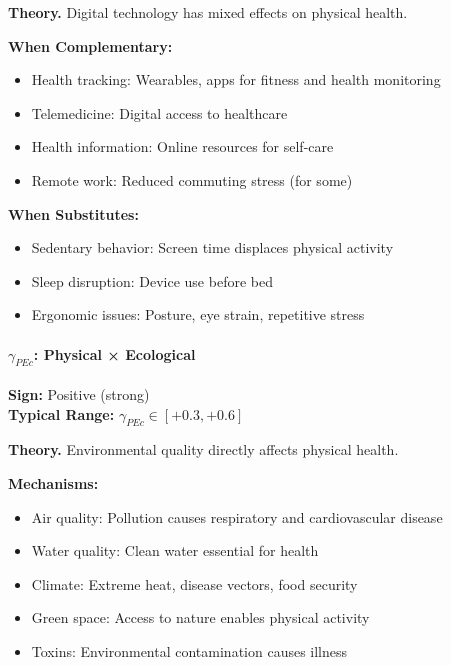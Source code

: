 \textbf{Theory.}
Digital technology has mixed effects on physical health.

\textbf{When Complementary:}
\begin{itemize}
    \item Health tracking: Wearables, apps for fitness and health monitoring
    \item Telemedicine: Digital access to healthcare
    \item Health information: Online resources for self-care
    \item Remote work: Reduced commuting stress (for some)
\end{itemize}

\textbf{When Substitutes:}
\begin{itemize}
    \item Sedentary behavior: Screen time displaces physical activity
    \item Sleep disruption: Device use before bed
    \item Ergonomic issues: Posture, eye strain, repetitive stress
\end{itemize}


\paragraph{$\gamma_{PEc}$: Physical × Ecological}

\begin{tcolorbox}[colback=green!5, colframe=green!50!black]
\textbf{Sign:} Positive (strong) \\
\textbf{Typical Range:} $\gamma_{PEc} \in [+0.3, +0.6]$
\end{tcolorbox}

\textbf{Theory.}
Environmental quality directly affects physical health.

\textbf{Mechanisms:}
\begin{itemize}
    \item Air quality: Pollution causes respiratory and cardiovascular disease
    \item Water quality: Clean water essential for health
    \item Climate: Extreme heat, disease vectors, food security
    \item Green space: Access to nature enables physical activity
    \item Toxins: Environmental contamination causes illness
\end{itemize}

